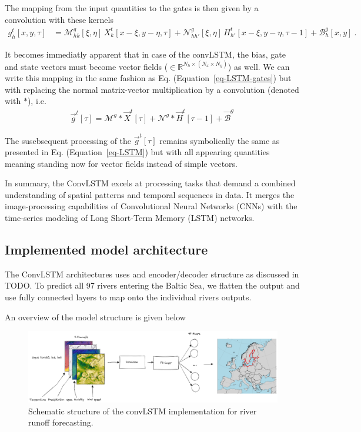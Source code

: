 \documentclass[
]{agujournal2019}
\begin{document}
The mapping from the input quantities to the gates is then given by a
convolution with these kernels \[
\begin{aligned}
g^t_h[x,y,\tau] & =  \mathcal{M}^{g}_{hk} [\xi,\eta]\, X^t_k[x-\xi, y-\eta, \tau]  +  \mathcal{N}^{g}_{hh'}[\xi,\eta] \, H^t_{h'}[x-\xi, y-\eta, \tau-1] + \mathcal{B}^g_{h}[x,y] \ .
\end{aligned}
\]

It becomes immediatly apparent that in case of the convLSTM, the bias,
gate and state vectors must become vector fields
(\(\in \mathbb{R}^{N_h \times (N_x \times N_y)}\)) as well. We can write
this mapping in the same fashion as Eq. (Equation~\ref{eq-LSTM-gates})
but with replacing the normal matrix-vector multiplication by a
convolution (denoted with \(\ast\)), i.e.\\
\[
\begin{aligned}
\vec{g}^t[\tau] = \pmb{\mathcal{M}}^{g} \ast \vec{X}^t[\tau] + \pmb{\mathcal{N}}^{g} \ast  \vec{H}^t[ \tau-1]+ \vec{\mathcal{B}}^g \,
\end{aligned}
\]

The susebsequent processing of the \(\vec{g}^t[\tau]\) remains
symbolically the same as presented in Eq. (Equation~\ref{eq-LSTM}) but
with all appearing quantities meaning standing now for vector fields
instead of simple vectors.

In summary, the ConvLSTM excels at processing tasks that demand a
combined understanding of spatial patterns and temporal sequences in
data. It merges the image-processing capabilities of Convolutional
Neural Networks (CNNs) with the time-series modeling of Long Short-Term
Memory (LSTM) networks.

\hypertarget{implemented-model-architecture}{%
\subsection{Implemented model
architecture}\label{implemented-model-architecture}}

The ConvLSTM architectures uses and encoder/decoder structure as
discussed in TODO. To predict all 97 rivers entering the Baltic Sea, we
flatten the output and use fully connected layers to map onto the
individual rivers outputs.

An overview of the model structure is given below

\begin{figure}

{\centering \includegraphics{convLSTM.png}

}

\caption{\label{fig-baltNet}Schematic structure of the convLSTM
implementation for river runoff forecasting.}

\end{figure}
\end{document}

